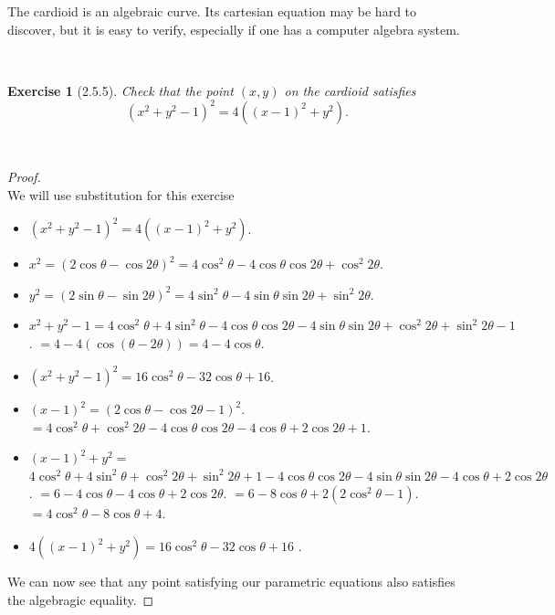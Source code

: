 \documentclass[12pt]{article}
\newcommand{\XB}{\color{black}}
\newcommand{\XBB}{\color{blue}}
\theoremstyle{plain}
\newtheorem{ex}{Exercise}
\begin{document}
\newpage

\begin{center}
  The cardioid is an algebraic curve. Its cartesian equation may be hard to discover, but it is easy to verify, especially if one has a computer algebra system.
\end{center}

\XBB\hrulefill\XB \\
\begin{ex} [2.5.5]
  Check that the point $(x,y)$ on the cardioid satisfies
  \[
    (x^2+y^2-1)^2=4((x-1)^2+y^2).
  \]
\end{ex}
\XBB\hrulefill\XB \\

\begin{proof}
  \ \\

  We will use substitution for this exercise

  \begin{itemize}
    \item $ (x^{2} + y^{2} - 1)^{2} = 4((x-1)^{2} + y^{2}) $.
    \item $ x^{2} = (2\cos\theta - \cos2\theta)^{2} = 4\cos^{2}\theta - 4\cos\theta\cos2\theta + \cos^{2}2\theta $.
    \item $ y^{2} = (2\sin\theta - \sin2\theta)^{2} = 4\sin^{2}\theta - 4\sin\theta\sin2\theta + \sin^{2}2\theta $.
    \item $ x^{2} + y^{2} - 1 = 4\cos^{2}\theta + 4\sin^{2}\theta - 4\cos\theta\cos2\theta - 4\sin\theta\sin2\theta + \cos^{2}2\theta + \sin^{2}2\theta - 1 $.
    \subitem $ = 4 - 4(\cos(\theta - 2\theta)) = 4 - 4\cos\theta $.
    \item $ (x^{2} + y^{2} - 1)^{2} = 16\cos^{2}\theta - 32\cos\theta + 16 $.
    \item $ (x-1)^{2} = (2\cos\theta - \cos2\theta -1)^2 $.
    \subitem $ = 4\cos^{2}\theta + \cos^{2}2\theta - 4\cos\theta\cos2\theta - 4\cos\theta + 2\cos2\theta + 1 $.
    \item $ (x-1)^{2} + y^{2} = $
    \subitem $ 4\cos^{2}\theta + 4\sin^{2}\theta + \cos^{2}2\theta + \sin^{2}2\theta + 1 - 4\cos\theta\cos2\theta - 4\sin\theta\sin2\theta - 4\cos\theta + 2\cos2\theta $.
    \subitem $ = 6 - 4\cos\theta - 4\cos\theta + 2\cos2\theta $.
    \subitem $ = 6 - 8\cos\theta + 2(2\cos^{2}\theta - 1) $.
    \subitem $ = 4\cos^2\theta - 8\cos\theta + 4 $.
    \item $ 4((x-1)^{2} + y^{2}) = 16\cos^{2}\theta - 32\cos\theta + 16 $ .
  \end{itemize}

  We can now see that any point satisfying our parametric equations also satisfies the algebragic equality.

\end{proof}
\end{document}
